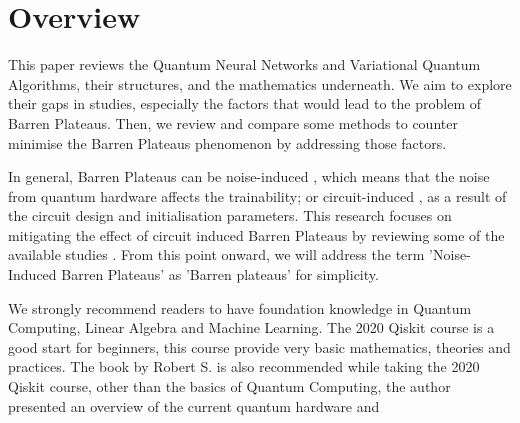 \section{Overview}
This paper reviews the Quantum Neural Networks and Variational Quantum Algorithms, their structures, and the mathematics underneath. 
We aim to explore their gaps in studies, especially the factors that would lead to the problem of Barren Plateaus.
Then, we review and compare some methods to counter minimise the Barren Plateaus phenomenon by addressing those factors.

In general, Barren Plateaus can be noise-induced \cite{wangNoiseinducedBarrenPlateaus2021}, which means that the noise from quantum hardware affects the trainability; 
or circuit-induced \cite{mccleanBarrenPlateausQuantum2018}, as a result of the circuit design and initialisation parameters.
This research focuses on mitigating the effect of circuit induced Barren Plateaus by reviewing some of the available studies \cite{pesahAbsenceBarrenPlateaus2021, cerezoCostFunctionDependent2021, skolikLayerwiseLearningQuantum2021}.
From this point onward, we will address the term 'Noise-Induced Barren Plateaus' as 'Barren plateaus' for simplicity.

We strongly recommend readers to have foundation knowledge in Quantum Computing, Linear Algebra and Machine Learning. 
The 2020 Qiskit course \cite{2020QiskitGlobal} is a good start for beginners, this course provide very basic mathematics, theories and practices. 
The book \cite{sutorDancingQubitsHow2019} by Robert S. is also recommended while taking the 2020 Qiskit course, other than the basics of Quantum Computing, the author presented an overview of the current quantum hardware and 